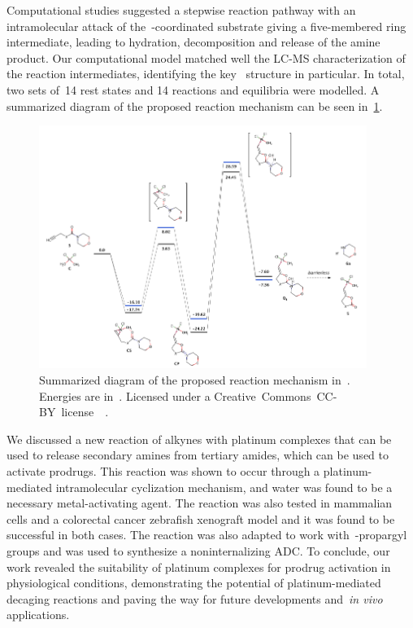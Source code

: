 Computational studies suggested a stepwise reaction pathway with an intramolecular attack
of the~-coordinated substrate giving a five-membered ring intermediate,
leading to hydration,
decomposition and release of the amine product.
Our computational model matched well the LC-MS characterization of the reaction intermediates,
identifying the key~ structure in particular.
In total,
two sets of~14 rest states and 14 reactions and equilibria were modelled.
A summarized diagram of the proposed reaction mechanism can be seen in~\cref{fig:paper2-reaction}.
%
\begin{figure}[hbtp]
	\centering
	\includegraphics[width=0.95\textwidth]{slides/public/paper2-reaction}
	\caption{Summarized diagram of the proposed reaction mechanism in~\citeauthor{Oliveira_2020}.
		Energies are in~\kcalmol.
		Licensed under a
		Creative~Commons~CC-BY~license~\ccby~\cite{ACS_CCBY_2014}.}\label{fig:paper2-reaction}
\end{figure}

We discussed a new reaction of alkynes with platinum complexes that can be used to release secondary amines from tertiary amides,
which can be used to activate prodrugs.
This reaction was shown to occur through a platinum-mediated intramolecular cyclization mechanism,
and water was found to be a necessary metal-activating agent.
The reaction was also tested in mammalian cells and a colorectal cancer zebrafish xenograft model
and it was found to be successful in both cases.
The reaction was also adapted to work with~-propargyl groups and was used to synthesize a noninternalizing ADC.\@
To conclude,
our work revealed the suitability of platinum complexes for prodrug activation in physiological conditions,
demonstrating the potential of platinum-mediated decaging reactions
and paving the way for future developments and~\emph{in vivo} applications.

